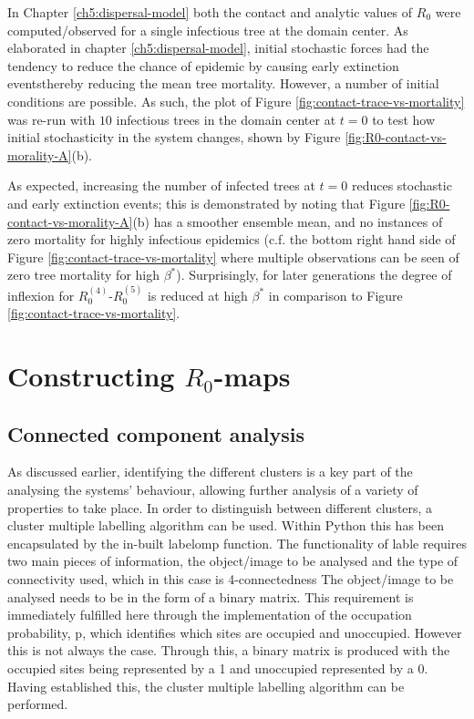 In Chapter \ref{ch5:dispersal-model} both the contact and analytic values of $R_0$ were computed/observed for a single infectious tree at the domain center.
As elaborated in chapter \ref{ch5:dispersal-model}, initial stochastic forces had the tendency to reduce the chance of epidemic by causing early extinction events\textemdash thereby reducing the mean tree mortality.
However, a number of initial conditions are possible.
As such, the plot of Figure \ref{fig:contact-trace-vs-mortality} was re-run with $10$ infectious trees in the domain center at $t=0$ to test how initial stochasticity in the system changes, shown by Figure \ref{fig:R0-contact-vs-morality-A}(b).

As expected, increasing the number of infected trees at $t=0$ reduces stochastic and early extinction events;
this is demonstrated by noting that Figure \ref{fig:R0-contact-vs-morality-A}(b) has a smoother ensemble mean, and no instances of zero mortality for highly infectious epidemics (c.f. the bottom right hand side of Figure \ref{fig:contact-trace-vs-mortality} where multiple observations can be seen of zero tree mortality for high $\beta^*$).
Surprisingly, for later generations the degree of inflexion for $R_0^{(4)}$-$R_0^{(5)}$ is reduced at high $\beta^*$ in comparison to Figure \ref{fig:contact-trace-vs-mortality}.

\newpage


\chapter{Constructing $R_0$-maps}

\label{section:ga-SEIR-variant}

\section{Connected component analysis}
\label{a:CCA}

As discussed earlier, identifying the different clusters is a key part of the analysing the systems’ behaviour, 
allowing further analysis of a variety of properties to take place. 
In order to distinguish between different clusters, a cluster multiple labelling algorithm can be used. 
Within Python this has been encapsulated by the in-built labelomp function. 
The functionality of lable requires two main pieces of information, the object/image to be analysed and the type of connectivity used, which in this case is 4-connectedness
The object/image to be analysed needs to be in the form of a binary matrix. 
This requirement is immediately fulfilled here through the implementation of the occupation probability, p, which identifies which sites are occupied and unoccupied.
However this is not always the case. 
Through this, a binary matrix is produced with the occupied sites being represented by a 1 and unoccupied represented by a 0. 
Having established this, the cluster multiple labelling algorithm can be performed.

